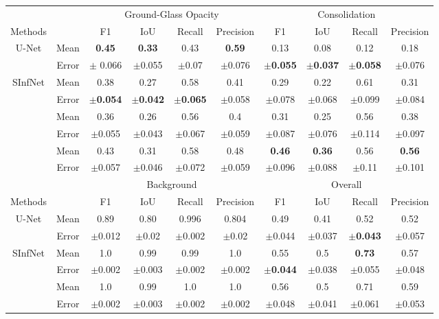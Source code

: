 \begin{table}[!h]
 	\centering
 	\small
 	\begin{tabular}{| c | c || c c c c || c c c c |}
 		\hline
 		& &\multicolumn{4}{c||}{Ground-Glass Opacity} & \multicolumn{4}{c|}{Consolidation}\\ \cline{3-10}
 		Methods & & F1 & IoU & Recall & Precision & F1 & IoU & Recall & Precision \\\hline
 		U-Net & Mean & \textbf{0.45} & \textbf{0.33} & 0.43 & \textbf{0.59} & 0.13 & 0.08 & 0.12 & 0.18 \\ \cline{2-10}
 		& Error & $\pm$ 0.066 & $\pm$0.055& $\pm$0.07& $\pm$0.076& \textbf{$\pm$0.055}& \textbf{$\pm$0.037}& \textbf{$\pm$0.058}& $\pm$0.076 \\ \hline
 		SInfNet & Mean & 0.38 & 0.27 & 0.58 & 0.41 & 0.29 & 0.22 & 0.61 & 0.31  \\ \cline{2-10}
 		& Error & \textbf{$\pm$0.054} & \textbf{$\pm$0.042} & \textbf{$\pm$0.065} & $\pm$0.058 & $\pm$0.078 & $\pm$0.068 & $\pm$0.099 & $\pm$0.084  \\ \hline \hline
 		
 		\vtop{\hbox{\strut SSInfNet}\hbox{\strut }} & Mean & 0.36 & 0.26 & 0.56 & 0.4 & 0.31 & 0.25 & 0.56 & 0.38 \\ \cline{2-10}
 		& Error & $\pm$0.055 & $\pm$0.043 & $\pm$0.067 & $\pm$0.059 & $\pm$0.087 & $\pm$0.076 & $\pm$0.114 & $\pm$0.097 \\ \hline \hline
 		
 		\vtop{\hbox{\strut SSInfNet+}\hbox{\strut focal loss+}\hbox{\strut lookahead}} & Mean & 0.43 & 0.31 & 0.58 & 0.48 & \textbf{0.46} & \textbf{0.36} & 0.56 & \textbf{0.56} \\ \cline{2-10}
 		& Error & $\pm$0.057 & $\pm$0.046 & $\pm$0.072 & $\pm$0.059 & $\pm$0.096 & $\pm$0.088 & $\pm$0.11 & $\pm$0.101 \\ \hline \hline \hline
 		
 		
 		& &\multicolumn{4}{c||}{Background} & \multicolumn{4}{c|}{Overall}\\ \cline{3-10}
 		Methods & & F1 & IoU & Recall & Precision & F1 & IoU & Recall & Precision \\\hline
 		U-Net & Mean & 0.89 & 0.80 & 0.996 & 0.804 & 0.49 & 0.41 & 0.52 & 0.52  \\ \cline{2-10}
 		& Error &  $\pm$0.012&  $\pm$0.02&  $\pm$0.002&  $\pm$0.02&  $\pm$0.044&  $\pm$0.037&  \textbf{$\pm$0.043}&  $\pm$0.057 \\ \hline
 		SInfNet & Mean & 1.0 & 0.99 & 0.99 & 1.0 & 0.55 & 0.5 & \textbf{0.73} & 0.57   \\ \cline{2-10}
 		& Error & $\pm$0.002 & $\pm$0.003 & $\pm$0.002 & $\pm$0.002 & \textbf{$\pm$0.044} & $\pm$0.038 & $\pm$0.055 & $\pm$0.048 \\ \hline
 		\vtop{\hbox{\strut SSInfNet}\hbox{\strut }} & Mean & 1.0 & 0.99 & 1.0 & 1.0 & 0.56 & 0.5 & 0.71 & 0.59 \\ \cline{2-10}
 		& Error & $\pm$0.002 & $\pm$0.003 & $\pm$0.002 & $\pm$0.002 & $\pm$0.048 & $\pm$0.041 & $\pm$0.061 & $\pm$0.053\\ \hline \hline


\end{tabular}
\end{table}
